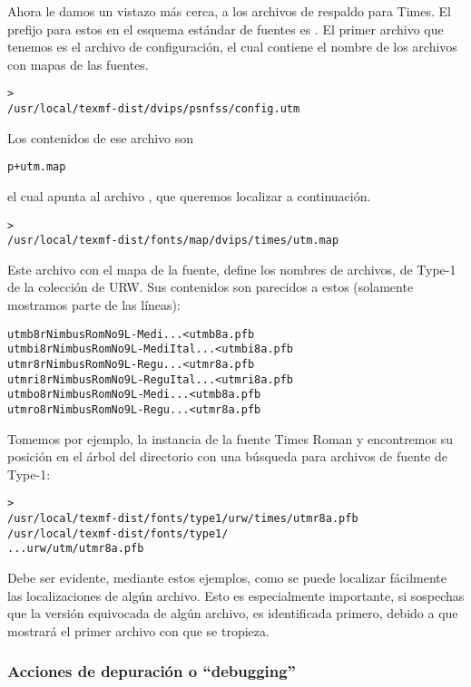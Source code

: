 \documentclass{article}
\begin{document}
Ahora le damos un vistazo más cerca, a los archivos de respaldo \PS{}
para  Times. El prefijo para estos en el esquema estándar de
fuentes es . El primer archivo que tenemos es el archivo de
configuración, el cual contiene el nombre de los archivos con mapas de
las fuentes. 
\begin{alltt}
> 
   /usr/local/texmf-dist/dvips/psnfss/config.utm
\end{alltt}
Los contenidos de ese archivo son 
\begin{alltt}
	p +utm.map
\end{alltt}
el cual apunta al archivo , que queremos localizar a continuación.
\begin{alltt}
> 
   /usr/local/texmf-dist/fonts/map/dvips/times/utm.map
\end{alltt}
Este archivo con el mapa de la fuente, define los nombres de archivos,
de Type-1 de la colección de URW. Sus contenidos son parecidos a estos
(solamente mostramos parte de las líneas):
\begin{alltt}
utmb8r  NimbusRomNo9L-Medi    ... <utmb8a.pfb
utmbi8r NimbusRomNo9L-MediItal... <utmbi8a.pfb
utmr8r  NimbusRomNo9L-Regu    ... <utmr8a.pfb
utmri8r NimbusRomNo9L-ReguItal... <utmri8a.pfb
utmbo8r NimbusRomNo9L-Medi    ... <utmb8a.pfb
utmro8r NimbusRomNo9L-Regu    ... <utmr8a.pfb
\end{alltt}
Tomemos por ejemplo, la instancia de la fuente Times Roman
 y encontremos su posición en el árbol del directorio
 con una búsqueda para archivos de fuente de Type-1:
\begin{alltt}
	> 
\ifSingleColumn   /usr/local/texmf-dist/fonts/type1/urw/times/utmr8a.pfb
\else   /usr/local/texmf-dist/fonts/type1/                              
... urw/utm/utmr8a.pfb                                                 
\fi\end{alltt}

Debe ser evidente, mediante estos ejemplos, como se puede localizar
fácilmente las localizaciones de algún archivo. Esto es especialmente
importante, si sospechas que la versión equivocada de algún archivo,
es identificada primero, debido a que  mostrará el
primer archivo con que se tropieza. 

\subsubsection{Acciones de depuración o ``debugging''}
\label{sec:debugging}
\end{document}
